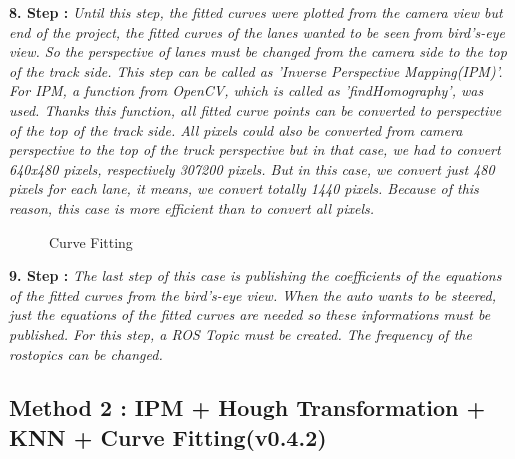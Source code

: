  
\textbf{8. Step : }\emph{\color{blue}Until this step, the fitted curves were plotted from the camera view but end of the project, the fitted curves of the lanes wanted to be seen from bird's-eye view. So the perspective of lanes must be changed from the camera side to the top of the track side. This step can be called as 'Inverse Perspective Mapping(IPM)'. For IPM, a function from OpenCV, which is called as 'findHomography', was used. Thanks this function, all fitted curve points can be converted to perspective of the top of the track side. All pixels could also be converted from camera perspective to the top of the truck perspective but in that case, we had to convert 640x480 pixels, respectively 307200 pixels. But in this case, we convert just 480 pixels for each lane, it means, we convert totally 1440 pixels. Because of this reason, this case is more efficient than to convert all pixels.}
 	 		 	
\begin{figure}[H]
  \centering
  \caption{Curve Fitting}
\end{figure} 


\textbf{9. Step : }\emph{\color{blue}The last step of this case is publishing the coefficients of the equations of the fitted curves from the bird's-eye view. When the auto wants to be steered, just the equations of the fitted curves are needed so these informations must be published. For this step, a ROS Topic must be created. The frequency of the rostopics can be changed.}

%

\subsection{Method 2 : IPM + Hough Transformation + KNN + Curve Fitting(v0.4.2)}\label{sec:Case 2}

